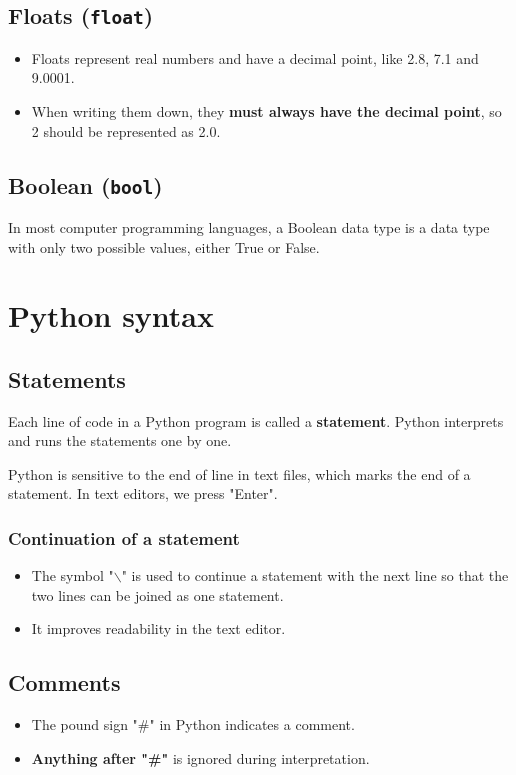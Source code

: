 \documentclass[11pt]{article}
\begin{document}
\subsection{Floats (\texttt{float})}
\label{sec:org88d482e}
\begin{itemize}
\item Floats represent real numbers and have a decimal point, like 2.8, 7.1 and 9.0001.
\item When writing them down, they \textbf{must always have the decimal point}, so 2 should be represented as 2.0.
\end{itemize}

\subsection{Boolean (\texttt{bool})}
\label{sec:org65c0777}
In most computer programming languages, a Boolean data type is a data type with only two possible values, either True or False.

 \newpage

\section{Python syntax}
\label{sec:org6c8631e}

\subsection{Statements}
\label{sec:org17a575d}
Each line of code in a Python program is called a \textbf{statement}. Python interprets and runs the statements one by one.

Python is sensitive to the end of line in text files, which marks the end of a statement. In text editors, we press "Enter".

\subsubsection{Continuation of a statement}
\label{sec:org22c7b95}
\begin{itemize}
\item The symbol "$\backslash$" is used to continue a statement with the next line so that the two lines can be joined as one statement.
\item It improves readability in the text editor.
\end{itemize}

\subsection{Comments}
\label{sec:org9207152}
\begin{itemize}
\item The pound sign "\#" in Python indicates a comment.
\item \textbf{Anything after "\#"} is ignored during interpretation.
\end{itemize}
\end{document}
